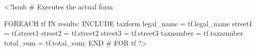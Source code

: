 \documentclass[usletter]{article}
\begin{document}
<?lsmb
  # Executes the actual form

   FOREACH tf IN results;
     INCLUDE taxform
       legal_name = tf.legal_name
       street1 = tf.street1
       street2 = tf.street2
       street3 = tf.street3
       taxnumber = tf.taxnumber
       total_sum = tf.total_sum;
   END # FOR tf  ?>
\end{document}
